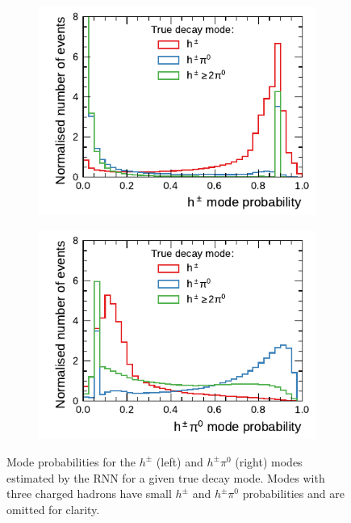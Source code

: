 \begin{figure}[htb]
  \begin{subfigure}[t]{0.48\textwidth}
    \centering
    \includegraphics{./figures/decay_mode_classification/mode_proba_baseline_ptcut_1_5_only_1p/proba_1p0n.pdf}
    \vspace*{-1.6em}
    \label{fig:1p0n_proba}
  \end{subfigure}\hfill
  \begin{subfigure}[t]{0.48\textwidth}
    \centering
    \includegraphics{./figures/decay_mode_classification/mode_proba_baseline_ptcut_1_5_only_1p/proba_1p1n.pdf}
    \vspace*{-1.6em}
    \label{fig:1p1n_proba}
  \end{subfigure}
  \caption{Mode probabilities for the $h^\pm$ (left) and $h^\pm \pi^0$ (right)
    modes estimated by the RNN for a given true decay mode. Modes with three
    charged hadrons have small $h^\pm$ and $h^\pm \pi^0$ probabilities and are
    omitted for clarity.}
  \label{fig:mode_proba_ptcut}
\end{figure}

